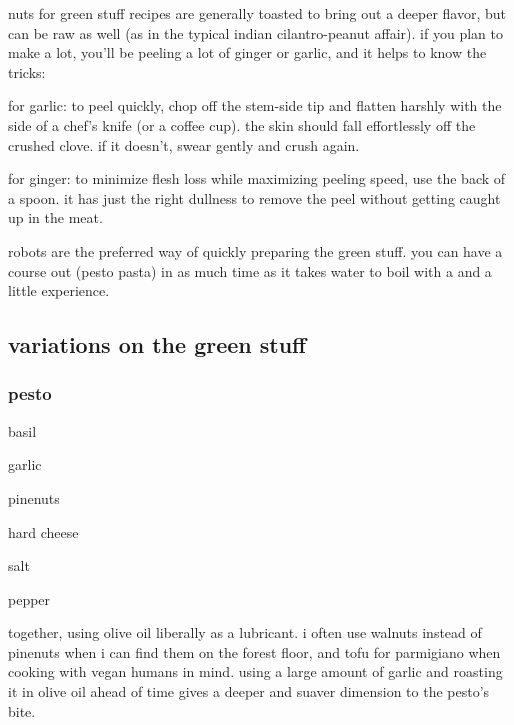 nuts for green stuff recipes are generally toasted to bring out a deeper 
flavor, but can be raw as well (as in the typical indian cilantro-peanut 
affair). if you plan to make a lot, you'll be peeling a lot of ginger or 
garlic, and it helps to know the tricks:

\begin{ingredients}
  \item for garlic: to peel quickly, chop off the stem-side tip and flatten 
  harshly with the side of a chef's knife (or a coffee cup). the skin should 
  fall effortlessly off the crushed clove. if it doesn't, swear gently and 
  crush again.

  \item for ginger: to minimize flesh loss while maximizing peeling speed, use 
  the back of a spoon. it has just the right dullness to remove the peel 
  without getting caught up in the meat.
\end{ingredients}

robots are the preferred way of quickly preparing the green stuff. you can have 
a course out (pesto pasta) in as much time as it takes water to boil with a 
 and a little experience.

\subsection{variations on the green stuff}

\subsubsection{pesto}

\begin{ingredients}
  \item basil
  \item garlic
  \item pinenuts
  \item hard cheese
  \item salt
  \item pepper
\end{ingredients}

 together, using olive oil liberally as a lubricant. i often use walnuts 
instead of pinenuts when i can find them on the forest floor, and tofu for 
parmigiano when cooking with vegan humans in mind. using a large amount of 
garlic and roasting it in olive oil ahead of time gives a deeper and suaver 
dimension to the pesto's bite.


